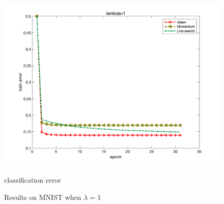 \documentclass{article}
\begin{document}
\begin{figure}[H]
\begin{minipage}{0.33\linewidth}
		\includegraphics[width=1\linewidth]{./fig/err_m2}
		\caption{classification error}
	\end{minipage}
	\caption*{Results on MNIST when $\lambda=1$}
\end{figure}
\end{document}
